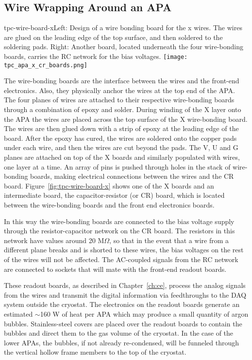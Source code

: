 \subsection{Wire Wrapping Around an APA}


\begin{cdrfigure}{tpc-wire-board-x}{Left: Design of a wire bonding board for the x wires.  The wires are glued on the leading edge of the top surface, and then soldered to the soldering pads. Right: Another board, located underneath the four wire-bonding boards, carries the RC network for the bias voltages.}
\texttt{[image: tpc\_apa\_x\_cr\_boards.png]}
\end{cdrfigure}

The wire-bonding boards  are the interface between the wires and the front-end electronics.  Also, they physically anchor the wires at the top end of the APA.  The four planes of wires are attached to their respective wire-bonding boards through a combination of epoxy and solder. During winding of the X layer onto the APA the wires are placed across the top surface of the X wire-bonding board. The wires are then glued down with a strip of epoxy at the leading edge of the board.  After the epoxy has cured, the wires are soldered onto the copper pads under each wire, and then the wires are cut beyond the pads. The V, U and G planes are attached on top of the X boards and similarly populated with wires, one layer at a time. An array of pins is pushed through holes in the stack of wire-bonding boards, making electrical connections between the wires and the CR board.   
Figure~\ref{fig:tpc-wire-board-x} shows one of the X boards and an intermediate board, the capacitor-resistor (or CR) board, which is located between the wire-bonding boards and the front end electronics boards.  

In this way the wire-bonding boards are connected to the bias voltage supply through the resistor-capacitor network on the CR board. The resistors in this network have values around 20 M$\Omega$, so that in the event that a wire from a different plane breaks and is shorted to these wires, the bias voltages on the rest of the wires will not be affected. The AC-coupled signals from the RC network are connected to sockets that will mate with the front-end readout boards.

These readout boards, as described in Chapter~\ref{ch:ce}, process the analog signals from the wires and transmit the digital information via feedthroughs to the DAQ system outside the cryostat. The electronics on the readout boards generate an estimated $\sim$160 W of heat per APA which may produce a small quantity of argon bubbles.  Stainless-steel covers are placed over the readout boards to contain the bubbles and direct them to the gas volume of the cryostat. In the case of the lower APAs, the bubbles, if not already re-condensed, will be funneled through the vertical hollow frame members to the top of the cryostat.



